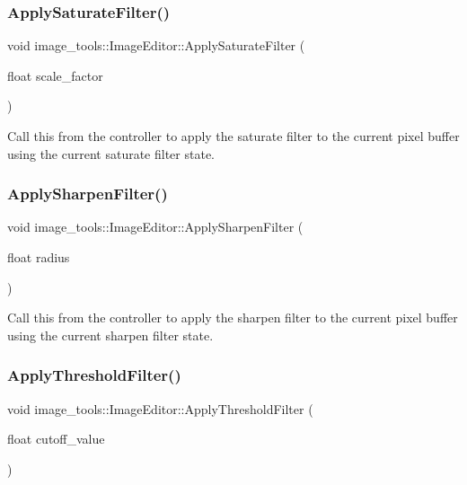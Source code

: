 \subsubsection{\texorpdfstring{Apply\+Saturate\+Filter()}{ApplySaturateFilter()}}
{\footnotesize\ttfamily void image\+\_\+tools\+::\+Image\+Editor\+::\+Apply\+Saturate\+Filter (\begin{DoxyParamCaption}\item[{float}]{scale\+\_\+factor }\end{DoxyParamCaption})}

Call this from the controller to apply the saturate filter to the current pixel buffer using the current saturate filter state. \mbox{\label{classimage__tools_1_1ImageEditor_a7b3c650d9caa4795fb5decc03969320d}} 
\subsubsection{\texorpdfstring{Apply\+Sharpen\+Filter()}{ApplySharpenFilter()}}
{\footnotesize\ttfamily void image\+\_\+tools\+::\+Image\+Editor\+::\+Apply\+Sharpen\+Filter (\begin{DoxyParamCaption}\item[{float}]{radius }\end{DoxyParamCaption})}

Call this from the controller to apply the sharpen filter to the current pixel buffer using the current sharpen filter state. \mbox{\label{classimage__tools_1_1ImageEditor_af370ba9fbed2d3a39c5175bd26250042}} 
\subsubsection{\texorpdfstring{Apply\+Threshold\+Filter()}{ApplyThresholdFilter()}}
{\footnotesize\ttfamily void image\+\_\+tools\+::\+Image\+Editor\+::\+Apply\+Threshold\+Filter (\begin{DoxyParamCaption}\item[{float}]{cutoff\+\_\+value }\end{DoxyParamCaption})}

